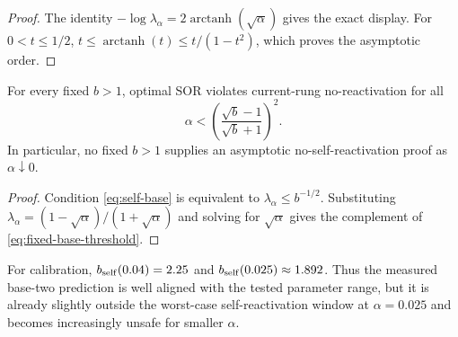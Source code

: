\begin{proof}
The identity
$-\log\lambda_\alpha=2\operatorname{arctanh}(\sqrt\alpha)$ gives the exact
display.  For $0<t\leq1/2$, $t\leq\operatorname{arctanh}(t)
\leq t/(1-t^2)$, which proves the asymptotic order.
\end{proof}

\begin{proposition}
\label{prop:fixed-base}
For every fixed $b>1$, optimal SOR violates current-rung no-reactivation for
all
\begin{equation}
 \alpha<\left(\frac{\sqrt b-1}{\sqrt b+1}\right)^2.
 \label{eq:fixed-base-threshold}
\end{equation}
In particular, no fixed $b>1$ supplies an asymptotic no-self-reactivation
proof as $\alpha\downarrow0$.
\end{proposition}

\begin{proof}
Condition \cref{eq:self-base} is equivalent to
$\lambda_\alpha\leq b^{-1/2}$.  Substituting
$\lambda_\alpha=(1-\sqrt\alpha)/(1+\sqrt\alpha)$ and solving for
$\sqrt\alpha$ gives the complement of \cref{eq:fixed-base-threshold}.
\end{proof}

For calibration, $b_{\rm self}(0.04)=2.25$ and
$b_{\rm self}(0.025)\approx1.892$.  Thus the measured base-two prediction is
well aligned with the tested parameter range, but it is already slightly
outside the worst-case self-reactivation window at $\alpha=0.025$ and becomes
increasingly unsafe for smaller $\alpha$.
